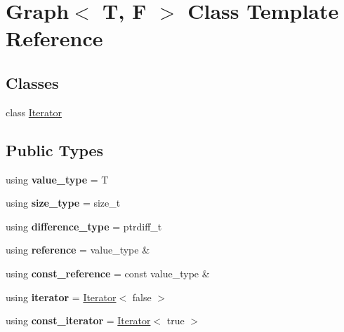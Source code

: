 \hypertarget{class_graph}{}\section{Graph$<$ T, F $>$ Class Template Reference}
\label{class_graph}
\subsection*{Classes}
\begin{DoxyCompactItemize}
\item 
class \hyperlink{class_graph_1_1_iterator}{Iterator}
\end{DoxyCompactItemize}
\subsection*{Public Types}
\begin{DoxyCompactItemize}
\item 
\mbox{\label{class_graph_aedf6cad874fd826bf77ab643200c39dc}} 
using {\bfseries value\+\_\+type} = T
\item 
\mbox{\label{class_graph_a80445edfcf7d49e6c79ae79360296e15}} 
using {\bfseries size\+\_\+type} = size\+\_\+t
\item 
\mbox{\label{class_graph_a207656ac7a99d90358f78b8c51f32494}} 
using {\bfseries difference\+\_\+type} = ptrdiff\+\_\+t
\item 
\mbox{\label{class_graph_af78f88103388afabda8a0b3967ad5c8e}} 
using {\bfseries reference} = value\+\_\+type \&
\item 
\mbox{\label{class_graph_a9ca79400773a3df3b6373b34d015532c}} 
using {\bfseries const\+\_\+reference} = const value\+\_\+type \&
\item 
\mbox{\label{class_graph_ae7feb4d2f5882998b5179262032faa62}} 
using {\bfseries iterator} = \hyperlink{class_graph_1_1_iterator}{Iterator}$<$ false $>$
\item 
\mbox{\label{class_graph_aa71325d80c02101dfc74f068848cae14}} 
using {\bfseries const\+\_\+iterator} = \hyperlink{class_graph_1_1_iterator}{Iterator}$<$ true $>$
\end{DoxyCompactItemize}

